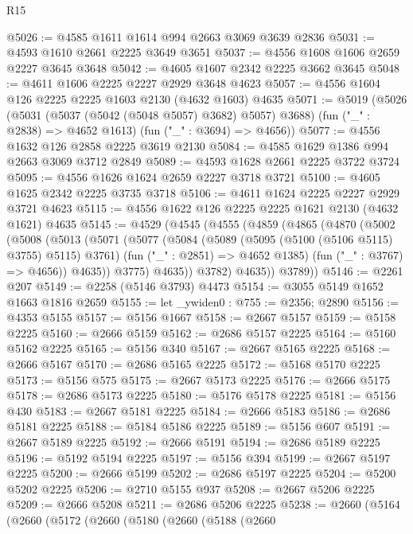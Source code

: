 \begin{lexlean}{R15}
\begin{coremodule}
@5026 := @4585 @1611 @1614 @994 @2663 @3069 @3639 @2836
@5031 := @4593 @1610 @2661 @2225 @3649 @3651
@5037 := @4556 @1608 @1606 @2659 @2227 @3645 @3648
@5042 := @4605 @1607 @2342 @2225 @3662 @3645
@5048 := @4611 @1606 @2225 @2227 @2929 @3648 @4623
@5057 := @4556 @1604 @126 @2225 @2225 @1603 @2130 (@4632 @1603) @4635
@5071 := @5019
    (@5026
      (@5031 (@5037 (@5042 (@5048 @5057) @3682) @5057) @3688)
      (fun ("_" : @2838) => @4652 @1613)
      (fun ("_" : @3694) => @4656))
@5077 := @4556 @1632 @126 @2858 @2225 @3619 @2130
@5084 := @4585 @1629 @1386 @994 @2663 @3069 @3712 @2849
@5089 := @4593 @1628 @2661 @2225 @3722 @3724
@5095 := @4556 @1626 @1624 @2659 @2227 @3718 @3721
@5100 := @4605 @1625 @2342 @2225 @3735 @3718
@5106 := @4611 @1624 @2225 @2227 @2929 @3721 @4623
@5115 := @4556 @1622 @126 @2225 @2225 @1621 @2130 (@4632 @1621) @4635
@5145 := @4529
    (@4545
      (@4555
        (@4859
          (@4865
            (@4870
              (@5002
                (@5008
                  (@5013
                    (@5071
                      (@5077
                        (@5084
                          (@5089 (@5095 (@5100 (@5106 @5115) @3755) @5115) @3761)
                          (fun ("_" : @2851) => @4652 @1385)
                          (fun ("_" : @3767) => @4656))
                        @4635))
                    @3775)
                  @4635))
              @3782)
            @4635))
        @3789))
@5146 := @2261 @207
@5149 := @2258 (@5146 @3793) @4473
@5154 := @3055 @5149 @1652 @1663 @1816 @2659
@5155 := let _ywiden0 : @755 := @2356; @2890
@5156 := @4353 @5155
@5157 := @5156 @1667
@5158 := @2667 @5157
@5159 := @5158 @2225
@5160 := @2666 @5159
@5162 := @2686 @5157 @2225
@5164 := @5160 @5162 @2225
@5165 := @5156 @340
@5167 := @2667 @5165 @2225
@5168 := @2666 @5167
@5170 := @2686 @5165 @2225
@5172 := @5168 @5170 @2225
@5173 := @5156 @575
@5175 := @2667 @5173 @2225
@5176 := @2666 @5175
@5178 := @2686 @5173 @2225
@5180 := @5176 @5178 @2225
@5181 := @5156 @430
@5183 := @2667 @5181 @2225
@5184 := @2666 @5183
@5186 := @2686 @5181 @2225
@5188 := @5184 @5186 @2225
@5189 := @5156 @607
@5191 := @2667 @5189 @2225
@5192 := @2666 @5191
@5194 := @2686 @5189 @2225
@5196 := @5192 @5194 @2225
@5197 := @5156 @394
@5199 := @2667 @5197 @2225
@5200 := @2666 @5199
@5202 := @2686 @5197 @2225
@5204 := @5200 @5202 @2225
@5206 := @2710 @5155 @937
@5208 := @2667 @5206 @2225
@5209 := @2666 @5208
@5211 := @2686 @5206 @2225
@5238 := @2660
    (@5164
      (@2660
        (@5172
          (@2660
            (@5180
              (@2660
                (@5188
                  (@2660

\end{coremodule}
\end{lexlean}
